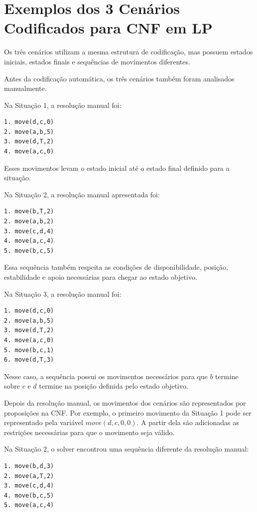 \documentclass{article}
\begin{document}
\section{Exemplos dos 3 Cenários Codificados para CNF em LP}

Os três cenários utilizam a mesma estrutura de codificação, mas possuem estados iniciais, estados finais e sequências de movimentos diferentes.

Antes da codificação automática, os três cenários também foram analisados manualmente.

Na Situação 1, a resolução manual foi:

\begin{verbatim}
1. move(d,c,0)
2. move(a,b,5)
3. move(d,T,2)
4. move(a,c,0)
\end{verbatim}

Esses movimentos levam o estado inicial até o estado final definido para a situação.

Na Situação 2, a resolução manual apresentada foi:

\begin{verbatim}
1. move(b,T,2)
2. move(a,b,2)
3. move(c,d,4)
4. move(a,c,4)
5. move(b,c,5)
\end{verbatim}

Essa sequência também respeita as condições de disponibilidade, posição, estabilidade e apoio necessárias para chegar ao estado objetivo.

Na Situação 3, a resolução manual foi:

\begin{verbatim}
1. move(d,c,0)
2. move(a,b,5)
3. move(d,T,2)
4. move(a,c,0)
5. move(b,c,1)
6. move(d,T,3)
\end{verbatim}

Nesse caso, a sequência possui os movimentos necessários para que $b$ termine sobre $c$ e $d$ termine na posição definida pelo estado objetivo.

Depois da resolução manual, os movimentos dos cenários são representados por proposições na CNF. Por exemplo, o primeiro movimento da Situação 1 pode ser representado pela variável $move(d,c,0,0)$. A partir dela são adicionadas as restrições necessárias para que o movimento seja válido.

Na Situação 2, o solver encontrou uma sequência diferente da resolução manual:

\begin{verbatim}
1. move(b,d,3)
2. move(a,T,2)
3. move(c,d,4)
4. move(b,c,5)
5. move(a,c,4)
\end{verbatim}
\end{document}
